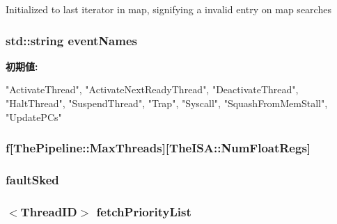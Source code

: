 \label{classInOrderCPU_ae38b3e563def292648d9f34e094f8cc8}
Initialized to last iterator in map, signifying a invalid entry on map searches \hypertarget{classInOrderCPU_a3e78f2c15e35e19acb51c1a41fc51130}{
\subsubsection[{eventNames}]{\setlength{\rightskip}{0pt plus 5cm}std::string {\bf eventNames}}}
\label{classInOrderCPU_a3e78f2c15e35e19acb51c1a41fc51130}
{\bfseries 初期値:}
\begin{DoxyCode}

{
    "ActivateThread",
    "ActivateNextReadyThread",
    "DeactivateThread",
    "HaltThread",
    "SuspendThread",
    "Trap",
    "Syscall",
    "SquashFromMemStall",
    "UpdatePCs"
}
\end{DoxyCode}
\hypertarget{classInOrderCPU_a527f4207ae79fbe77bddd111013c163e}{
\subsubsection[{f}]{ {\bf f}\mbox{[}{\bf ThePipeline::MaxThreads}\mbox{]}\mbox{[}TheISA::NumFloatRegs\mbox{]}}}
\label{classInOrderCPU_a527f4207ae79fbe77bddd111013c163e}
\hypertarget{classInOrderCPU_a74928ed9838a0cd492269c937268ec16}{
\subsubsection[{faultSked}]{ {\bf faultSked}}}
\label{classInOrderCPU_a74928ed9838a0cd492269c937268ec16}
\hypertarget{classInOrderCPU_a22a54b30ea66b2e4740a1a3d55de098f}{
\subsubsection[{fetchPriorityList}]{$<${\bf ThreadID}$>$ {\bf fetchPriorityList}}}
